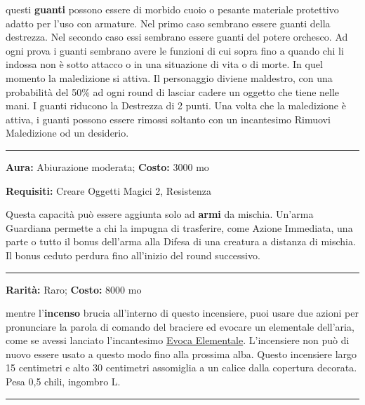 \begin{multicols}{2}
questi \textbf{guanti} possono essere di morbido cuoio o pesante materiale protettivo adatto per l'uso con armature. Nel primo caso sembrano essere guanti della destrezza. Nel secondo caso essi sembrano essere guanti del potere orchesco. Ad ogni prova i guanti sembrano avere le funzioni di cui sopra fino a quando chi li indossa non è sotto attacco o in una situazione di vita o di morte. In quel momento la maledizione si attiva. Il personaggio diviene maldestro, con una probabilità del 50\% ad ogni round di lasciar cadere un oggetto che tiene nelle mani. I guanti riducono la Destrezza di 2 punti. Una volta che la maledizione è attiva, i guanti possono essere rimossi soltanto con un incantesimo Rimuovi Maledizione od un desiderio.

\smallskip\noindent\rule{\linewidth}{2pt}  \hypertarget{Guardiana}{}\medskip{}\noindent\label{Guardiana}

\textbf{Aura:} Abiurazione moderata; \textbf{Costo:} 3000 mo

\textbf{Requisiti:} Creare Oggetti Magici 2, Resistenza

Questa capacità può essere aggiunta solo ad \textbf{armi} da mischia. Un'arma Guardiana permette a chi la impugna di trasferire, come Azione Immediata, una parte o tutto il bonus dell'arma alla Difesa di una creatura a distanza di mischia. Il bonus ceduto perdura fino all'inizio del round successivo.

\smallskip\noindent\rule{\linewidth}{2pt}  \hypertarget{IncensieredegliElementalidell'Aria}{}\medskip{}\noindent\label{IncensieredegliElementalidell'Aria}

\textbf{Rarità:} Raro; \textbf{Costo:} 8000 mo

mentre l'\textbf{incenso} brucia all'interno di questo incensiere, puoi usare due azioni per pronunciare la parola di comando del braciere ed evocare un elementale dell'aria, come se avessi lanciato l'incantesimo \hyperlink{Evoca Elementale}{Evoca Elementale}. L'incensiere non può di nuovo essere usato a questo modo fino alla prossima alba. Questo incensiere largo 15 centimetri e alto 30 centimetri assomiglia a un calice dalla copertura decorata. Pesa 0,5 chili, ingombro L.

\smallskip\noindent\rule{\linewidth}{2pt}  \hypertarget{Incensodell'Ossessione}{}\medskip{}\noindent\label{Incensodell'Ossessione}


\end{multicols}
